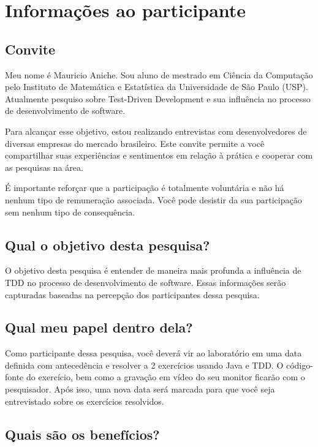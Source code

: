 \chapter{Informações ao participante}
\label{ape:informacoes-participante}

\section{Convite}

Meu nome é Mauricio Aniche. Sou aluno de mestrado em Ciência da Computação pelo
Instituto de Matemática e Estatística da Universidade de São Paulo (USP).
Atualmente pesquiso sobre Test-Driven Development e sua influência no processo
de desenvolvimento de software.

Para alcançar esse objetivo, estou realizando entrevistas com desenvolvedores de
diversas empresas do mercado brasileiro.
Este convite permite a você compartilhar suas experiências e sentimentos em
relação à prática e cooperar com as pesquisas na área.

É importante reforçar que a participação é totalmente voluntária e não há nenhum
tipo de remuneração associada. Você pode desistir da sua participação sem nenhum
tipo de consequência.

\section{Qual o objetivo desta pesquisa?}

O objetivo desta pesquisa é entender de maneira mais profunda a influência de TDD
no processo de desenvolvimento de software. Essas informações serão
capturadas baseadas na percepção dos participantes dessa pesquisa.

\section{Qual meu papel dentro dela?}

Como participante dessa pesquisa, você deverá vir ao laboratório em uma
data definida com antecedência e resolver a 2 exercícios usando Java e TDD.
O código-fonte do exercício, bem como a gravação em vídeo do seu monitor
ficarão com o pesquisador.
Após isso, uma nova data será marcada para que você seja entrevistado sobre
os exercícios resolvidos.

\section{Quais são os benefícios?}

